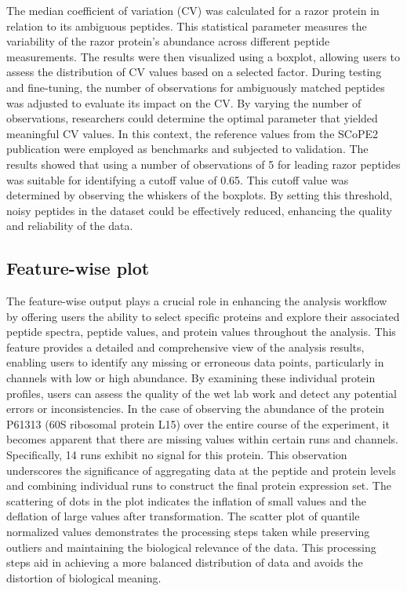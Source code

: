 \documentclass[
  11pt,
]{article}
\begin{document}
The median coefficient of variation (CV) was calculated for a razor protein in relation to its ambiguous peptides. This statistical parameter measures the variability of the razor protein's abundance across different peptide measurements. The results were then visualized using a boxplot, allowing users to assess the distribution of CV values based on a selected factor.
During testing and fine-tuning, the number of observations for ambiguously matched peptides was adjusted to evaluate its impact on the CV. By varying the number of observations, researchers could determine the optimal parameter that yielded meaningful CV values. In this context, the reference values from the SCoPE2 publication \citep{Specht2021} were employed as benchmarks and subjected to validation.
The results showed that using a number of observations of 5 for leading razor peptides was suitable for identifying a cutoff value of 0.65. This cutoff value was determined by observing the whiskers of the boxplots. By setting this threshold, noisy peptides in the dataset could be effectively reduced, enhancing the quality and reliability of the data.

\hypertarget{feature-wise-plot}{%
\subsection{Feature-wise plot}\label{feature-wise-plot}}

The feature-wise output plays a crucial role in enhancing the analysis workflow by offering users the ability to select specific proteins and explore their associated peptide spectra, peptide values, and protein values throughout the analysis. This feature provides a detailed and comprehensive view of the analysis results, enabling users to identify any missing or erroneous data points, particularly in channels with low or high abundance. By examining these individual protein profiles, users can assess the quality of the wet lab work and detect any potential errors or inconsistencies.
In the case of observing the abundance of the protein P61313 (60S ribosomal protein L15) over the entire course of the experiment, it becomes apparent that there are missing values within certain runs and channels. Specifically, 14 runs exhibit no signal for this protein. This observation underscores the significance of aggregating data at the peptide and protein levels and combining individual runs to construct the final protein expression set.
The scattering of dots in the plot indicates the inflation of small values and the deflation of large values after transformation. The scatter plot of quantile normalized values demonstrates the processing steps taken while preserving outliers and maintaining the biological relevance of the data. This processing steps aid in achieving a more balanced distribution of data and avoids the distortion of biological meaning.
\end{document}
